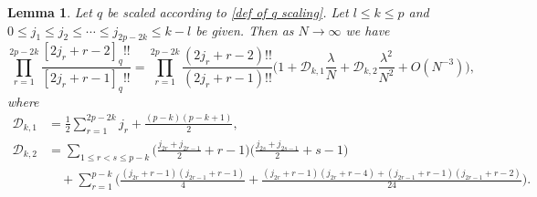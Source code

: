\documentclass{amsart}
\theoremstyle{plain}
\newtheorem{lem}[thm]{Lemma}
\theoremstyle{remark}
\numberwithin{equation}{section}
\begin{document}
\begin{lem}\label{lem:mfrakF2}
    Let $q$ be scaled according to \eqref{def of q scaling}. Let $l\leq k\leq p$ and $0\leq j_1 \leq j_2 \leq \cdots \leq j_{2p-2k}\leq k-l$ be given. Then as $N\rightarrow\infty$ we have
    \begin{equation}\label{Hsummandasymp}
        \prod_{r=1}^{2p-2k}\frac{[2j_{r}+r-2]_{q}!!}{[2j_{r}+r-1]_{q}!!}
        =\prod_{r=1}^{2p-2k}\frac{(2j_r +r-2)!!}{(2j_r+r-1)!!}
        \Big(1+\mathcal{D}_{k,1}\frac{\lambda}{N}+\mathcal{D}_{k,2}\frac{\lambda^2}{N^{2}}+O(N^{-3})\Big), 
    \end{equation}
    where
    \begin{align*}
        \mathcal{D}_{k,1}& =\frac{1}{2}\sum_{r=1}^{2p-2k}j_r + \frac{(p-k)(p-k+1)}{2}, 
        \\
        \mathcal{D}_{k,2}
        &= \sum_{1\leq r<s\leq p-k}\Big(\frac{j_{2r}+j_{2r-1}}{2}+r-1\Big) \Big(\frac{j_{2s}+j_{2s-1}}{2}+s-1\Big)
        \\
        &\quad+\sum_{r=1}^{p-k}\Big(\frac{(j_{2r}+r-1)(j_{2r-1}+r-1)}{4}
        +\frac{(j_{2r}+r-1)(j_{2r}+r-4)+(j_{2r-1}+r-1)(j_{2r-1}+r-2)}{24}\Big). 
    \end{align*}
\end{lem}
\end{document}
